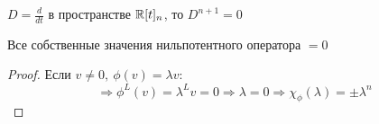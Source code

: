     \begin{example1}
        $D = \frac{d}{dt}$ в пространстве $\mathbb{R}[t]_n$, то $D^{n+1} = 0$   
    \end{example1}
    \begin{subtheorem}
        Все собственные значения нильпотентного оператора $= 0$
    \end{subtheorem} 
    \begin{proof}
        Если $v \neq 0, \ \phi(v) = \lambda v:$
        $$\Longrightarrow \phi^L(v) = \lambda^Lv = 0 \Longrightarrow \lambda = 0 \Longrightarrow \chi_\phi(\lambda) = \pm \lambda^n$$
    \end{proof}  
    




    